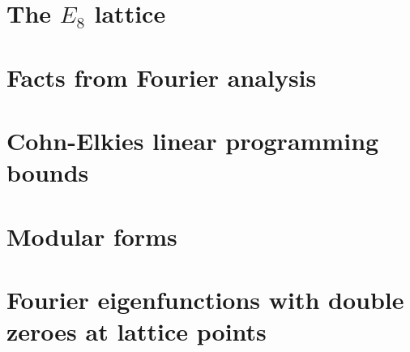 


\pagebreak
\section{The $E_8$ lattice}


\pagebreak
\section{Facts from Fourier analysis}  %


\pagebreak
\section{Cohn-Elkies linear programming bounds}


\pagebreak
\section{Modular forms}


\pagebreak
\section{Fourier eigenfunctions with double zeroes at lattice points}\label{sec: fourier double zeroes}




